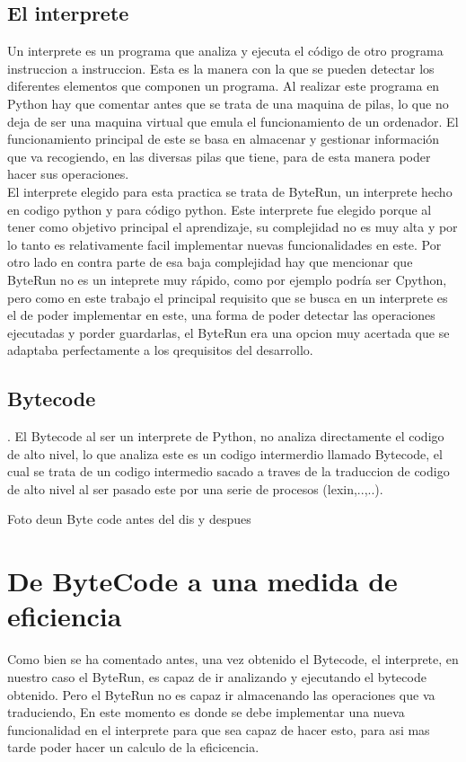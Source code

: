 \subsection{El interprete}

Un interprete es un programa que analiza y ejecuta el código de otro programa instruccion a instruccion. Esta es la manera con la que se pueden detectar los diferentes elementos que componen un programa. Al realizar este programa en Python hay que comentar antes que se trata de una maquina de pilas, lo que no deja de ser una maquina virtual que emula el funcionamiento de un ordenador. El funcionamiento principal de este se basa en almacenar y gestionar información que va recogiendo, en las diversas pilas que tiene, para de esta manera poder hacer sus operaciones.\\
El interprete elegido para esta practica se trata de ByteRun, un interprete hecho en codigo python y para código python. Este interprete fue elegido porque al tener como objetivo principal el aprendizaje, su complejidad no es muy alta y por lo tanto es relativamente facil implementar nuevas funcionalidades en este. Por otro lado en contra parte de esa baja complejidad hay que mencionar que ByteRun no es un inteprete muy rápido, como por ejemplo podría ser Cpython, pero como en este trabajo el principal requisito que se busca en un interprete es el de poder implementar en este, una forma de poder detectar las operaciones ejecutadas y porder guardarlas, el ByteRun era una opcion muy acertada que se adaptaba perfectamente a los qrequisitos del desarrollo.


\subsection{Bytecode}.
El Bytecode al ser un interprete de Python, no analiza directamente el codigo de alto nivel, lo que analiza este es un codigo intermerdio llamado Bytecode, el cual se trata de un codigo intermedio sacado a traves de la traduccion de codigo de alto nivel al ser pasado este por una serie de procesos (lexin,..,..).

Foto deun Byte code
antes del dis y despues


\section{De ByteCode a una medida de eficiencia}

Como bien se ha comentado antes, una vez obtenido el Bytecode, el interprete, en nuestro caso el ByteRun, es capaz de ir analizando y ejecutando el bytecode obtenido. Pero el ByteRun no es capaz ir almacenando las operaciones que va traduciendo, En este momento es donde se debe implementar una nueva funcionalidad en el interprete para que sea capaz de hacer esto, para asi mas tarde poder hacer un calculo de  la eficicencia.


